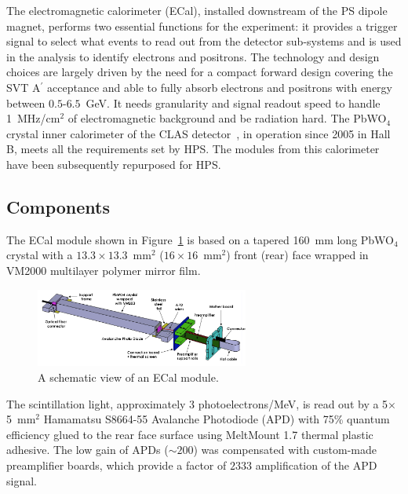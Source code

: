 \documentclass[final,3p,times,twocolumn]{elsarticle}
\newcommand{\Aprime}{A\ensuremath{^\prime}}
\begin{document}
The electromagnetic calorimeter (ECal), installed downstream of the PS dipole magnet, performs two 
essential functions for the experiment: it provides a trigger signal to select what events to read out from 
the detector sub-systems and is used in the analysis to identify electrons and positrons. 
The technology and design choices are largely driven by the need for a compact forward design 
covering the SVT \Aprime{} acceptance and able to fully absorb 
electrons and positrons with energy between $0.5$-$6.5$~GeV.  It needs granularity and signal 
readout speed to handle 1~MHz/cm$^{2}$ of electromagnetic background and be radiation hard. 
The PbWO$_{4}$ crystal inner 
calorimeter of the CLAS detector~\cite{2008erhm.conf..421N}, in operation since 2005 in Hall B, meets 
all the requirements set by HPS. The modules from this calorimeter have been subsequently 
repurposed for HPS. 


\subsection{Components}

The ECal module shown in Figure~\ref{fig:ecal-module} is based on a tapered 160~mm long 
PbWO$_{4}$ crystal with a $13.3\times13.3$~mm$^2$ ($16\times16$~mm$^2$) front 
(rear) face wrapped in VM2000 multilayer polymer mirror film. 
\begin{figure}[]
\begin{center}
{\small
\includegraphics[width=7cm]{figures/ecal-module-schematic.png}
\caption{A schematic view of an ECal module.}
\label{fig:ecal-module}
}
\end{center}
\end{figure}
The scintillation light, approximately $3$ photoelectrons/MeV, is read out by a 
5$\times$5~mm$^2$ Hamamatsu S8664-55 Avalanche Photodiode (APD) with 75\% quantum 
efficiency glued to the rear face surface using MeltMount 1.7 thermal plastic adhesive. 
The low gain of APDs ($\sim 200$) was compensated with custom-made preamplifier boards, which 
provide a factor of $2333$ amplification of the APD signal.
\end{document}
